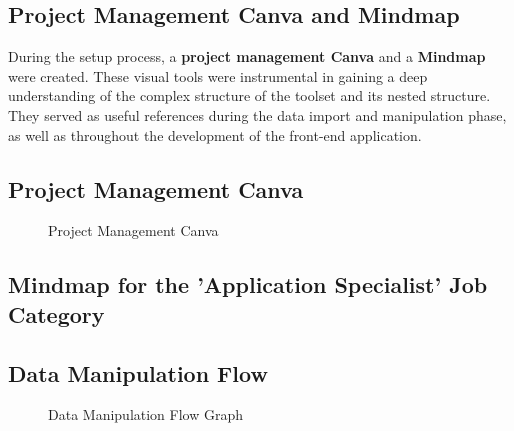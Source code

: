 \subsection{ Project Management Canva and Mindmap}

During the setup process, a {\color{limeGreen}\textbf{project management Canva}} and a {\color{limeGreen}\textbf{Mindmap}} were created. These visual tools were instrumental in gaining a deep  
understanding of the complex structure of the  toolset and its nested structure. 
They served as useful references during the data import and manipulation phase, as well as throughout the development of the front-end application.


\subsection{Project Management Canva}
\begin{figure}[H]
    \centering
    \caption{ Project Management Canva }
    \label{fig: Project-Management-Canva}
\end{figure}

\newpage
\subsection*{Mindmap for the 'Application Specialist' Job Category}

\newpage
\subsection{Data Manipulation Flow}
\begin{figure}[H]
    \centering
    \caption{ Data Manipulation Flow Graph }
    \label{fig: Data_Manipulation_Flow_Graph}
\end{figure}



